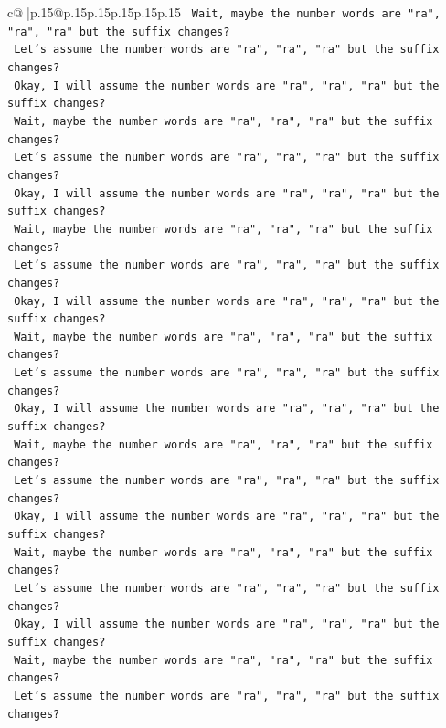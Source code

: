 \documentclass{article}
\begin{document}
{\begin{supertabular}{c@{$\;$}|p{.15\linewidth}@{}p{.15\linewidth}p{.15\linewidth}p{.15\linewidth}p{.15\linewidth}p{.15\linewidth}}
{{{\texttt{    Wait, maybe the number words are "ra", "ra", "ra" but the suffix changes?} \\
\texttt{    Let's assume the number words are "ra", "ra", "ra" but the suffix changes?} \\
\texttt{    Okay, I will assume the number words are "ra", "ra", "ra" but the suffix changes?} \\
\texttt{    Wait, maybe the number words are "ra", "ra", "ra" but the suffix changes?} \\
\texttt{    Let's assume the number words are "ra", "ra", "ra" but the suffix changes?} \\
\texttt{    Okay, I will assume the number words are "ra", "ra", "ra" but the suffix changes?} \\
\texttt{    Wait, maybe the number words are "ra", "ra", "ra" but the suffix changes?} \\
\texttt{    Let's assume the number words are "ra", "ra", "ra" but the suffix changes?} \\
\texttt{    Okay, I will assume the number words are "ra", "ra", "ra" but the suffix changes?} \\
\texttt{    Wait, maybe the number words are "ra", "ra", "ra" but the suffix changes?} \\
\texttt{    Let's assume the number words are "ra", "ra", "ra" but the suffix changes?} \\
\texttt{    Okay, I will assume the number words are "ra", "ra", "ra" but the suffix changes?} \\
\texttt{    Wait, maybe the number words are "ra", "ra", "ra" but the suffix changes?} \\
\texttt{    Let's assume the number words are "ra", "ra", "ra" but the suffix changes?} \\
\texttt{    Okay, I will assume the number words are "ra", "ra", "ra" but the suffix changes?} \\
\texttt{    Wait, maybe the number words are "ra", "ra", "ra" but the suffix changes?} \\
\texttt{    Let's assume the number words are "ra", "ra", "ra" but the suffix changes?} \\
\texttt{    Okay, I will assume the number words are "ra", "ra", "ra" but the suffix changes?} \\
\texttt{    Wait, maybe the number words are "ra", "ra", "ra" but the suffix changes?} \\
\texttt{    Let's assume the number words are "ra", "ra", "ra" but the suffix changes?} \\
}}}
\end{supertabular}}
\end{document}
